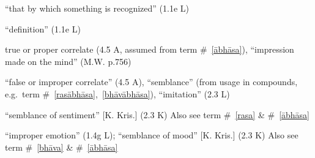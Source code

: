 \documentclass[10pt]{article}
\begin{document}
\begin{multicols}{2}
\begin{enumerate}[
			leftmargin=0em,
			rightmargin=0em,
		]
		 ``that by which something is recognized'' (1.1e L)

		 ``definition'' (1.1e L)

		 true or proper correlate (4.5 A, assumed from term \#~\ref{ābhāsa}),
		``impression made on the mind'' (M.W. p.756)

		 ``false or improper correlate'' (4.5 A),
		``semblance'' (from usage in compounds, e.g.\ term \#~\ref{rasābhāsa},~\ref{bhāvābhāsa}),
		``imitation'' (2.3 L)

		 ``semblance of sentiment'' [K. Kris.] (2.3 K)
		Also see term \#~\ref{rasa} \& \#~\ref{ābhāsa}

		 ``improper emotion'' (1.4g L);
		``semblance of mood'' [K. Kris.] (2.3 K)
		Also see term \#~\ref{bhāva} \& \#~\ref{ābhāsa}


\end{enumerate}
\end{multicols}
\end{document}
